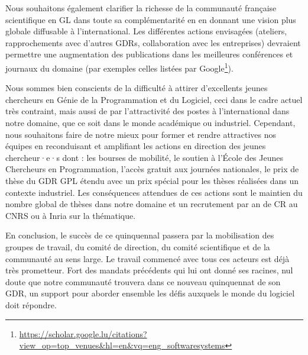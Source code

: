 \documentclass[11pt]{article}
\begin{document}
Nous souhaitons également clarifier la richesse de la communauté française scientifique en GL dans toute sa complémentarité en en donnant une vision plus globale diffusable à l’international. Les différentes actions envisagées (ateliers, rapprochements avec d’autres GDRs, collaboration avec les entreprises) devraient permettre une augmentation des publications dans les meilleures conférences et journaux du domaine (par  exemples celles listées par Google\footnote{ \url{https://scholar.google.lu/citations?view_op=top_venues&hl=en&vq=eng_softwaresystems}}).

Nous sommes bien conscients de la difficulté à attirer d’excellents jeunes chercheurs en Génie de la Programmation et du Logiciel, ceci dans le cadre actuel très contraint, mais aussi de par l’attractivité des postes à l’international dans notre domaine, que ce soit dans le monde académique ou industriel. Cependant, nous souhaitons faire de notre mieux pour former et rendre attractives nos équipes en 
reconduisant et amplifiant les actions en direction des jeunes chercheur·e·s dont : les bourses de mobilité, le soutien à l'École des Jeunes Chercheurs en Programmation, l'accès gratuit aux journées nationales, le prix de thèse du GDR GPL étendu avec un prix spécial pour les thèses réalisées dans un contexte industriel.  Les conséquences attendues de ces actions sont  le maintien du nombre global de thèses dans notre domaine et un recrutement par an de CR au CNRS ou à Inria sur la thématique. 


En conclusion, le succès de ce quinquennal passera par la mobilisation des groupes
de travail, du comité de direction, du comité scientifique et de la communauté au sens large. Le travail commencé avec tous ces acteurs est déjà très prometteur. Fort des mandats précédents qui lui ont donné ses racines, nul doute que notre communauté trouvera dans ce nouveau quinquennat de son GDR, un support pour aborder ensemble les défis auxquels le monde du logiciel doit répondre.


\end{document}
